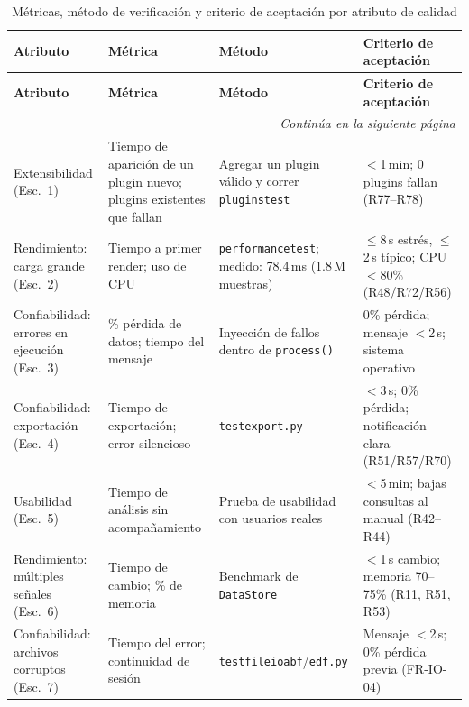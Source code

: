 \documentclass[11pt,a4paper]{article}
\DeclareRobustCommand{\_}{\textunderscore\allowbreak}
\begin{document}
\begin{center}
\small
\begin{longtable}{|p{}|p{}|p{}|p{}|}
\caption{M\'etricas, m\'etodo de verificaci\'on y criterio de aceptaci\'on por atributo de calidad} \label{tab:metricas} \\
\hline
\textbf{Atributo} & \textbf{M\'etrica} & \textbf{M\'etodo} & \textbf{Criterio de aceptaci\'on} \\
\hline
\endfirsthead
\hline
\textbf{Atributo} & \textbf{M\'etrica} & \textbf{M\'etodo} & \textbf{Criterio de aceptaci\'on} \\
\hline
\endhead
\hline
\multicolumn{4}{r}{\textit{Contin\'ua en la siguiente p\'agina}} \\
\endfoot
\hline
\endlastfoot

Extensibilidad (Esc.~1) &
Tiempo de aparici\'on de un plugin nuevo; plugins existentes que fallan &
Agregar un plugin v\'alido y correr \texttt{plugins\_\allowbreak test} &
$<$1\,min; 0 plugins fallan (R77--R78) \\
\hline

Rendimiento: carga grande (Esc.~2) &
Tiempo a primer render; uso de CPU &
\texttt{performance\_\allowbreak test}; medido: 78.4\,ms (1.8\,M muestras) &
$\leq$8\,s estr\'es, $\leq$2\,s t\'ipico; CPU $<$80\% (R48/R72/R56) \\
\hline

Confiabilidad: errores en ejecuci\'on (Esc.~3) &
\% p\'erdida de datos; tiempo del mensaje &
Inyecci\'on de fallos dentro de \texttt{process()} &
0\% p\'erdida; mensaje $<$2\,s; sistema operativo \\
\hline

Confiabilidad: exportaci\'on (Esc.~4) &
Tiempo de exportaci\'on; error silencioso &
\texttt{test\_\allowbreak export.py} &
$<$3\,s; 0\% p\'erdida; notificaci\'on clara (R51/R57/R70) \\
\hline

Usabilidad (Esc.~5) &
Tiempo de an\'alisis sin acompa\~namiento &
Prueba de usabilidad con usuarios reales &
$<$5\,min; bajas consultas al manual (R42--R44) \\
\hline

Rendimiento: m\'ultiples se\~nales (Esc.~6) &
Tiempo de cambio; \% de memoria &
Benchmark de \texttt{DataStore} &
$<$1\,s cambio; memoria 70--75\% (R11, R51, R53) \\
\hline

Confiabilidad: archivos corruptos (Esc.~7) &
Tiempo del error; continuidad de sesi\'on &
\texttt{test\_\allowbreak fileio\_\allowbreak abf}/\texttt{edf.py} &
Mensaje $<$2\,s; 0\% p\'erdida previa (FR-IO-04) \\
\hline


\end{longtable}
\end{center}
\end{document}
